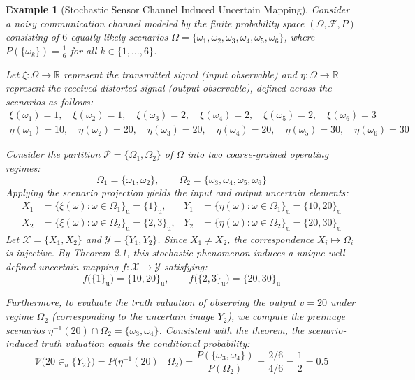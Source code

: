 \documentclass[a4paper,12pt, twoside]{memoir}
\newtheorem{example}{Example}[chapter]
\newcommand{\tbd}[1]{\mathcal{#1}} %
\newcommand{\s}[1]{\{#1\}_\mathrm{u}} %
\begin{document}
	\begin{example}[Stochastic Sensor Channel Induced Uncertain Mapping]
		Consider a noisy communication channel modeled by the finite probability space $(\Omega, \mathcal{F}, P)$ consisting of $6$ equally likely scenarios $\Omega = \{\omega_1, \omega_2, \omega_3, \omega_4, \omega_5, \omega_6\}$, where $P(\{\omega_k\}) = \frac{1}{6}$ for all $k \in \{1, \dots, 6\}$.
		
		Let $\xi : \Omega \to \mathbb{R}$ represent the transmitted signal (input observable) and $\eta : \Omega \to \mathbb{R}$ represent the received distorted signal (output observable), defined across the scenarios as follows:
		\begin{align*}
			\xi(\omega_1) = 1, \quad \xi(\omega_2) = 1, \quad \xi(\omega_3) = 2, \quad \xi(\omega_4) = 2, \quad \xi(\omega_5) = 2, \quad \xi(\omega_6) = 3 \\
			\eta(\omega_1) = 10, \quad \eta(\omega_2) = 20, \quad \eta(\omega_3) = 20, \quad \eta(\omega_4) = 20, \quad \eta(\omega_5) = 30, \quad \eta(\omega_6) = 30
		\end{align*}
		
		Consider the partition $\mathcal{P} = \{\Omega_1, \Omega_2\}$ of $\Omega$ into two coarse-grained operating regimes:
		\[
		\Omega_1 = \{\omega_1, \omega_2\}, \qquad \Omega_2 = \{\omega_3, \omega_4, \omega_5, \omega_6\}
		\]
		Applying the scenario projection yields the input and output uncertain elements:
		\begin{align*}
			X_1 &= \big\{ \xi(\omega) : \omega \in \Omega_1 \big\}_\mathrm{u} = \s{1}, & Y_1 &= \big\{ \eta(\omega) : \omega \in \Omega_1 \big\}_\mathrm{u} = \s{10, 20} \\
			X_2 &= \big\{ \xi(\omega) : \omega \in \Omega_2 \big\}_\mathrm{u} = \s{2, 3}, & Y_2 &= \big\{ \eta(\omega) : \omega \in \Omega_2 \big\}_\mathrm{u} = \s{20, 30}
		\end{align*}
		Let $\tbd{X} = \{X_1, X_2\}$ and $\tbd{Y} = \{Y_1, Y_2\}$. Since $X_1 \neq X_2$, the correspondence $X_i \mapsto \Omega_i$ is injective. By Theorem 2.1, this stochastic phenomenon induces a unique well-defined uncertain mapping $f : \tbd{X} \to \tbd{Y}$ satisfying:
		\[
		f\big(\s{1}\big) = \s{10, 20}, \qquad f\big(\s{2, 3}\big) = \s{20, 30}
		\]
		
		Furthermore, to evaluate the truth valuation of observing the output $v = 20$ under regime $\Omega_2$ (corresponding to the uncertain image $Y_2$), we compute the preimage scenarios $\eta^{-1}(20) \cap \Omega_2 = \{\omega_3, \omega_4\}$. Consistent with the theorem, the scenario-induced truth valuation equals the conditional probability:
		\[
		\mathcal{V}\big(20 \in_u \{Y_2\}\big) = P\big(\eta^{-1}(20) \mid \Omega_2\big) = \frac{P(\{\omega_3, \omega_4\})}{P(\Omega_2)} = \frac{2/6}{4/6} = \frac{1}{2} = 0.5
		\]
	\end{example}
\end{document}
